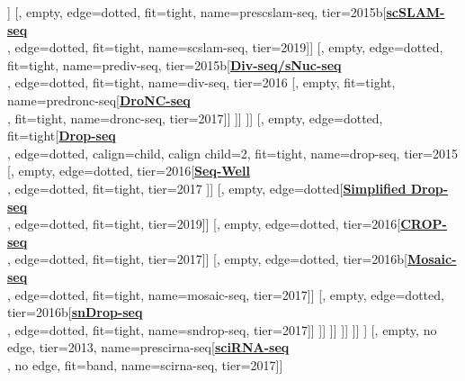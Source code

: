 \documentclass[12pt, a4]{article}
\begin{document}
\begin{center}
\begin{forest}
						[, empty, edge=dotted, tier=2015b[\href{https://www.nature.com/articles/nbt.4259}{\textbf{ScISOr-seq}}\\\citealt{gupta2018}, edge=dotted, fit=tight, tier=2018]]
						[, empty, edge=dotted, fit=tight, name=prescslam-seq, tier=2015b[\href{https://www.nature.com/articles/s41586-019-1369-y}{\textbf{scSLAM-seq}}\\\citealt{erhard2019}, edge=dotted, fit=tight, name=scslam-seq, tier=2019]]
						[, empty, edge=dotted, fit=tight, name=prediv-seq, tier=2015b[\href{https://science.sciencemag.org/content/353/6302/925.long}{\textbf{Div-seq/sNuc-seq}}\\\citealt{habib2016}, edge=dotted, fit=tight, name=div-seq, tier=2016
							[, empty, fit=tight, name=predronc-seq[\href{https://www.nature.com/articles/nmeth.4407}{\textbf{DroNC-seq}}\\\citealt{habib2017}, fit=tight, name=dronc-seq, tier=2017]]
						]]
				]]
				[, empty, edge=dotted, fit=tight[\href{https://www.cell.com/abstract/S0092-8674(15)00549-8}{\textbf{Drop-seq}}\\\citealt{macosko2015}, edge=dotted, calign=child, calign child=2, fit=tight, name=drop-seq, tier=2015
					[, empty, edge=dotted, tier=2016[\href{https://www.nature.com/articles/nmeth.4179}{\textbf{Seq-Well}}\\\citealt{gierahn2017}, edge=dotted, fit=tight, tier=2017
					]]
					[, empty, edge=dotted[\href{https://pubs.rsc.org/en/content/articlelanding/2019/lc/c9lc00014c}{\textbf{Simplified Drop-seq}}\\\citealt{biocanin2019}, edge=dotted, fit=tight, tier=2019]]
					[, empty, edge=dotted, tier=2016[\href{https://www.nature.com/articles/nmeth.4177}{\textbf{CROP-seq}}\\\citealt{datlinger2017}, edge=dotted, fit=tight, tier=2017]]
					[, empty, edge=dotted, tier=2016b[\href{https://www.sciencedirect.com/science/article/pii/S1097276517301740}{\textbf{Mosaic-seq}}\\\citealt{xie2017}, edge=dotted, fit=tight, name=mosaic-seq, tier=2017]]
					[, empty, edge=dotted, tier=2016b[\href{https://www.nature.com/articles/nbt.4038}{\textbf{snDrop-seq}}\\\citealt{lake2017a}, edge=dotted, fit=tight, name=sndrop-seq, tier=2017]]
				]]
			]]
		]]
	]]
	]
	[, empty, no edge, tier=2013, name=prescirna-seq[\href{https://science.sciencemag.org/content/357/6352/661}{\textbf{sciRNA-seq}}\\\citealt{cao2017}, no edge, fit=band, name=scirna-seq, tier=2017]]

\end{forest}
\end{center}
\end{document}
